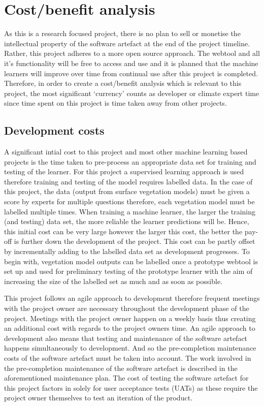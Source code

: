 \documentclass{ecmm427_assignment}
\begin{document}
\section{Cost/benefit analysis}
As this is a research focused project, there is no plan to sell or monetise the intellectual property of the software artefact at the end of the project timeline. Rather, this project adheres to a more open source approach. The webtool and all it’s functionality will be free to access and use and it is planned that the machine learners will improve over time from continual use after this project is completed. Therefore, in order to create a cost/benefit analysis which is relevant to this project, the most significant ‘currency’ counts as developer or climate expert time since time spent on this project is time taken away from other projects.

\subsection{Development costs}
A significant intial cost to this project and most other machine learning based projects is the time taken to pre-process an appropriate data set for training and testing of the learner. For this project a supervised learning approach is used therefore training and testing of the model requires labelled data. In the case of this project, the data (output from surface vegetation models) must be given a score by experts for multiple questions therefore, each vegetation model must be labelled multiple times. When training a machine learner, the larger the training (and testing) data set, the more reliable the learner predictions will be. Hence, this initial cost can be very large however the larger this cost, the better the pay-off is further down the development of the project. This cost can be partly offset by incrementally adding to the labelled data set as development progresses. To begin with, vegetation model outputs can be labelled once a prototype webtool is set up and used for preliminary testing of the prototype learner with the aim of increasing the size of the labelled set as much and as soon as possible.\par

This project follows an agile approach to development therefore frequent meetings with the project owner are necessary throughout the development phase of the project. Meetings with the project owner happen on a weekly basis thus creating an additional cost with regards to the project owners time. An agile approach to development also means that testing and maintenance of the software artefact happens simultaneously to development. And so the pre-completion maintenance costs of the software artefact must be taken into account. The work involved in the pre-completion maintenance of the software artefact is described in the aforementioned maintenance plan. The cost of testing the software artefact for this project factors in solely for user acceptance tests (UATs) as these require the project owner themselves to test an iteration of the product.\par
\end{document}
